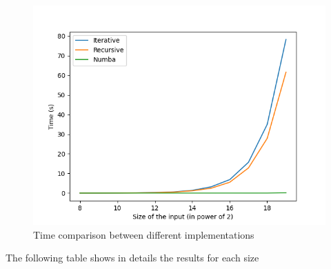 \documentclass[a4paper, 12pt, oneside]{article}
\begin{document}
\begin{figure}[H]
  \includegraphics[width=400pt]{images/cpu_vs_gpu.png}
  \caption{Time comparison between different implementations}
\end{figure}

The following table shows in details the results for each size
\end{document}
